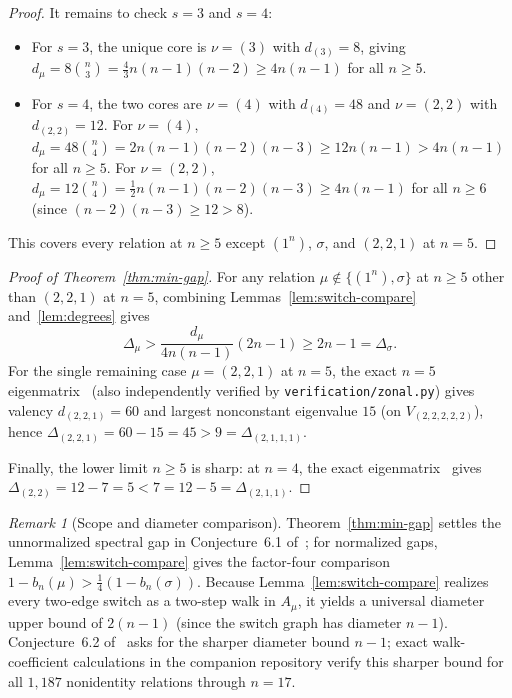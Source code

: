 \documentclass[11pt]{article}
\theoremstyle{remark}
\newtheorem{remark}[theorem]{Remark}
\begin{document}
\begin{proof}
It remains to check $s = 3$ and $s = 4$:
\begin{itemize}
  \item For $s = 3$, the unique core is $\nu = (3)$ with $d_{(3)} = 8$, giving
  $d_\mu = 8\binom{n}{3} = \frac{4}{3} n(n-1)(n-2) \ge 4n(n-1)$ for all
  $n \ge 5$.
  \item For $s = 4$, the two cores are $\nu = (4)$ with $d_{(4)} = 48$ and
  $\nu = (2,2)$ with $d_{(2,2)} = 12$. For $\nu = (4)$,
  $d_\mu = 48\binom{n}{4} = 2 n(n-1)(n-2)(n-3) \ge 12 n(n-1) > 4n(n-1)$ for all
  $n \ge 5$. For $\nu = (2,2)$,
  $d_\mu = 12\binom{n}{4} = \frac{1}{2} n(n-1)(n-2)(n-3) \ge 4n(n-1)$ for all
  $n \ge 6$ (since $(n-2)(n-3) \ge 12 > 8$).
\end{itemize}
This covers every relation at $n \ge 5$ except $(1^n)$, $\sigma$, and
$(2, 2, 1)$ at $n = 5$.
\end{proof}

\begin{proof}[Proof of Theorem~\ref{thm:min-gap}]
For any relation $\mu \notin \{(1^n), \sigma\}$ at $n \ge 5$ other than
$(2, 2, 1)$ at $n = 5$, combining Lemmas~\ref{lem:switch-compare}
and~\ref{lem:degrees} gives
\[
  \Delta_\mu > \frac{d_\mu}{4 n(n-1)}(2n - 1) \ge 2n - 1 = \Delta_\sigma.
\]
For the single remaining case $\mu = (2, 2, 1)$ at $n = 5$, the exact $n = 5$
eigenmatrix~\cite[Appendix~A, Table~6]{GuptaEtAl} (also independently verified
by \texttt{verification/zonal.py}) gives valency $d_{(2,2,1)} = 60$ and largest
nonconstant eigenvalue $15$ (on $V_{(2,2,2,2,2)}$), hence
$\Delta_{(2,2,1)} = 60 - 15 = 45 > 9 = \Delta_{(2,1,1,1)}$.

Finally, the lower limit $n \ge 5$ is sharp: at $n = 4$, the exact
eigenmatrix~\cite[Appendix~A, Table~5]{GuptaEtAl} gives
$\Delta_{(2,2)} = 12 - 7 = 5 < 7 = 12 - 5 = \Delta_{(2,1,1)}$.
\end{proof}

\begin{remark}[Scope and diameter comparison]\label{rem:scope}
Theorem~\ref{thm:min-gap} settles the unnormalized spectral gap in
Conjecture~6.1 of~\cite{GuptaEtAl}; for normalized gaps,
Lemma~\ref{lem:switch-compare} gives the factor-four comparison
$1 - b_n(\mu) > \frac{1}{4}(1 - b_n(\sigma))$. Because Lemma~\ref{lem:switch-compare}
realizes every two-edge switch as a two-step walk in $A_\mu$, it yields a
universal diameter upper bound of $2(n-1)$ (since the switch graph has diameter
$n - 1$). Conjecture~6.2 of~\cite{GuptaEtAl} asks for the sharper diameter
bound $n - 1$; exact walk-coefficient calculations in the companion repository
verify this sharper bound for all $1{,}187$ nonidentity relations through
$n = 17$.
\end{remark}
\end{document}
